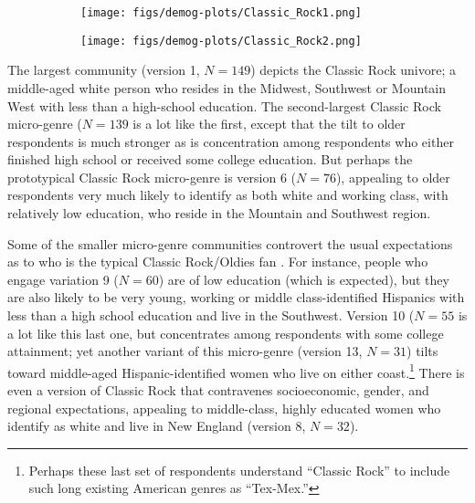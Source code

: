 \begin{figure}[ht!]
    \centering
     \begin{subfigure}[b]{0.8\textwidth}
        \texttt{[image: figs/demog-plots/Classic\_Rock1.png]}
        \caption{}
        \label{fig:Class-Rock1}
    \end{subfigure} 
     \begin{subfigure}[b]{0.8\textwidth}
        \texttt{[image: figs/demog-plots/Classic\_Rock2.png]}
        \caption{}
        \label{fig:Class-Rock2}
    \end{subfigure}
     \caption{}
  \label{fig:Class-Rock}
 \end{figure}
 
The largest community (version 1, $N = 149$) depicts the Classic Rock univore; a middle-aged white person who resides in the Midwest, Southwest or Mountain West with less than a high-school education. The second-largest Classic Rock micro-genre ($N = 139$ is a lot like the first, except that the tilt to older respondents is much stronger as is concentration among respondents who either finished high school or received some college education. But perhaps the prototypical Classic Rock micro-genre is version 6 ($N = 76$), appealing to older respondents very much likely to identify as both white and working class, with relatively low education, who reside in the Mountain and Southwest region. 

Some of the smaller micro-genre communities controvert the usual expectations as to who is the typical Classic Rock/Oldies fan \citep{lizardo_skiles16}. For instance, people who engage variation 9 ($N = 60$) are of low education (which is expected), but they are also likely to be very young, working or middle class-identified Hispanics with less than a high school education and live in the Southwest. Version 10 ($N = 55$ is a lot like this last one, but concentrates among respondents with some college attainment; yet another variant of this micro-genre (version 13, $N = 31$) tilts toward middle-aged Hispanic-identified women who live on either coast.\footnote{Perhaps these last set of respondents understand ``Classic Rock'' to include such long existing American genres as ``Tex-Mex.''} There is even a version of Classic Rock that contravenes socioeconomic, gender, and regional expectations, appealing to middle-class, highly educated women who identify as white and live in New England (version 8, $N = 32$). 

